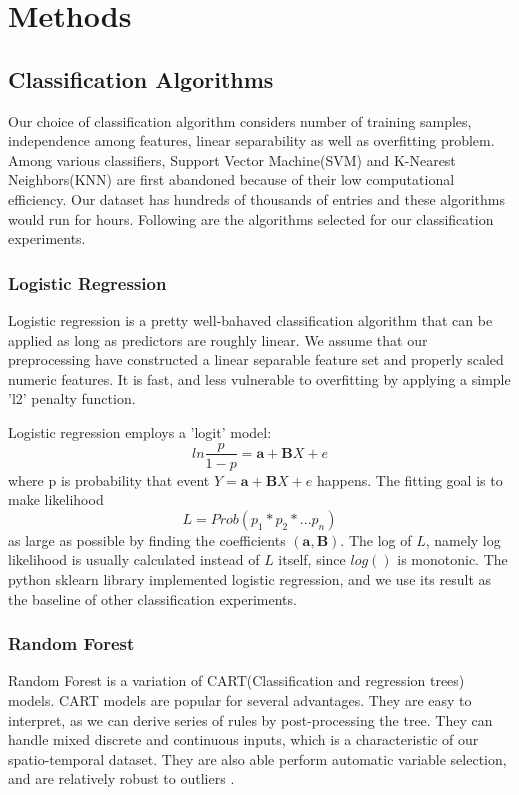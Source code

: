 \documentclass[11pt,conference]{IEEEtran}
\begin{document}
\section{Methods}
\subsection{Classification Algorithms}
Our choice of classification algorithm considers number of training samples, independence among features, linear separability as well as overfitting problem. Among various classifiers, Support Vector Machine(SVM) and K-Nearest Neighbors(KNN) are first abandoned because of their low computational efficiency. Our dataset has hundreds of thousands of entries and these algorithms would run for hours. Following are the algorithms selected for our classification experiments.\\

\subsubsection{Logistic Regression}
Logistic regression is a pretty well-bahaved classification algorithm that can be applied as long as predictors are roughly linear. We assume that our preprocessing have constructed a linear separable feature set and properly scaled numeric features. It is fast, and less vulnerable to overfitting by applying a simple 'l2' penalty function. 

Logistic regression employs a 'logit' model: $$ln\frac{p}{1-p}=\textbf{a} + \textbf{B}X + e$$ where p is probability that event $Y = \textbf{a} + \textbf{B}X + e$ happens. The fitting goal is to make likelihood $$L = Prob(p_1 * p_2 * ... p_n)$$ as large as possible by finding the coefficients $(\textbf{a}, \textbf{B})$. The log of $L$, namely log likelihood is usually calculated instead of $L$ itself, since $log()$ is monotonic. The python sklearn library implemented logistic regression, and we use its result as the baseline of other classification experiments.

\subsubsection{Random Forest}
Random Forest is a variation of CART(Classification and regression trees) models. CART models are popular for several advantages. They are easy to interpret, as we can derive series of rules by post-processing the tree. They can handle mixed discrete and continuous inputs, which is a characteristic of our spatio-temporal dataset. They are also able perform automatic variable selection, and are relatively robust to outliers \cite{2}. 
\end{document}
